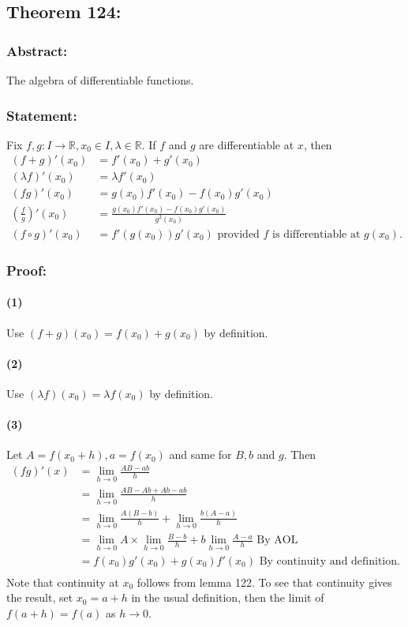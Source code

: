 \documentclass{article}
\begin{document}
\subsection{Theorem 124:}
\subsubsection*{Abstract:}
The algebra of differentiable functions.
\subsubsection*{Statement:}
Fix $f,g:I \to \mathbb{R}, x_0 \in I, \lambda \in \mathbb{R}$. If $f$ and $g$
are differentiable at $x$, then
\begin{align}
(f+g)'(x_0) &= f'(x_0)+g'(x_0) \\
(\lambda f)'(x_0) &= \lambda f'(x_0) \\
(fg)'(x_0) &= g(x_0)f'(x_0)-f(x_0)g'(x_0) \\
\left( \frac{f}{g} \right) '(x_0) &= \frac{g(x_0)f'(x_0)-f(x_0)g'(x_0)}{g^2(x_0)} \\
(f \circ g)'(x_0) &= f'(g(x_0))g'(x_0) \text{ provided $f$ is differentiable at $g(x_0)$}.
\end{align}
\subsubsection*{Proof:}
\paragraph{(1)}
Use $(f+g)(x_0) = f(x_0)+g(x_0)$ by definition.
\paragraph{(2)}
Use $(\lambda f)(x_0) = \lambda f(x_0)$ by definition.
\paragraph{(3)}
Let $A = f(x_0+h), a = f(x_0)$ and same for $B,b$ and $g$. Then
\begin{align*}
(fg)'(x) &= \lim_{h \to 0}\frac{AB-ab}{h} \\
&= \lim_{h \to 0}\frac{AB-Ab+Ab-ab}{h} \\
&= \lim_{h \to 0}\frac{A(B-b)}{h}+\lim_{h \to 0}\frac{b(A-a)}{h} \\
&= \lim_{h \to 0}A \times \lim_{h \to 0}\frac{B-b}{h}+b\lim_{h \to 0}\frac{A-a}{h} \text{ By AOL} \\
&= f(x_0)g'(x_0)+g(x_0)f'(x_0) \text{ By continuity and definition.} \\
\end{align*}
Note that continuity at $x_0$ follows from lemma 122. To see that continuity gives the result,
set $x_0 = a+h$ in the usual definition, then the limit of $f(a+h) = f(a)$ as $h \to 0$.
\end{document}

